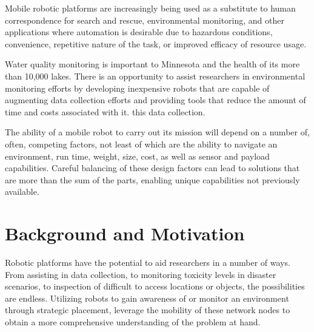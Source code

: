 
Mobile robotic platforms are increasingly being used as a substitute to human correspondence for search and rescue, environmental monitoring, and other applications where automation is desirable due to hazardous conditions, convenience, repetitive nature of the task, or improved efficacy of resource usage. 

Water quality monitoring is important to Minnesota and the health of its more than 10,000 lakes. There is an opportunity to assist researchers in environmental monitoring efforts by developing inexpensive robots that are capable of augmenting data collection efforts and providing tools that reduce the amount of time and costs associated with it. this data collection. 

The ability of a mobile robot to carry out its mission will depend on a number of, often, competing factors, not least of which are the ability to navigate an environment, run time, weight, size, cost, as well as sensor and payload capabilities. Careful balancing of these design factors can lead to solutions that are more than the sum of the parts, enabling unique capabilities not previously available.

\section{Background and Motivation}
	\label{sec:background_and_motivation}


	Robotic platforms have the potential to aid researchers in a number of ways.  From assisting in data collection, to monitoring toxicity levels in disaster scenarios, to inspection of difficult to access locations or objects, the possibilities are endless. Utilizing robots to gain awareness of or monitor an environment through strategic placement, leverage the mobility of these network nodes to obtain a more comprehensive understanding of the problem at hand. 

